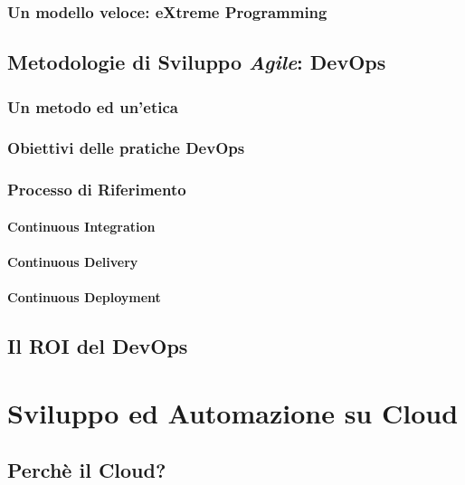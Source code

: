 \documentclass[a4paper,12pt]{report}
\begin{document}
			\subsection{Un modello veloce: eXtreme Programming}
	
		\section{Metodologie di Sviluppo \emph{Agile}: DevOps}
	
			\subsection{Un metodo ed un'etica}
			
			\subsection{Obiettivi delle pratiche DevOps}
			
			\subsection{Processo di Riferimento}
	
				\subsubsection{Continuous Integration}
				
				\subsubsection{Continuous Delivery}
				
				\subsubsection{Continuous Deployment}
	
		\section{Il ROI del DevOps}
	
	\chapter{Sviluppo ed Automazione su Cloud}
	
	\section{Perchè il Cloud?}
	
\end{document}
